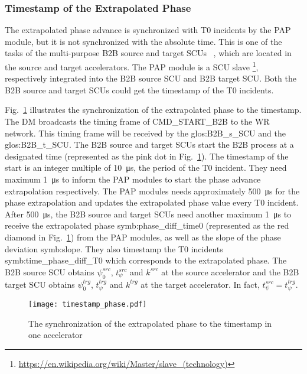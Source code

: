 \subsubsection{Timestamp of the Extrapolated Phase}
The extrapolated phase advance is synchronized with T0 incidents by the PAP module, but it is not synchronized with the absolute time. This is one of the tasks of the multi-purpose B2B source and target SCUs ~\cite{beck_new_2012, thieme_scu_2013}, which are located in the source and target accelerators. The PAP module is a SCU slave \footnote{\url{https://en.wikipedia.org/wiki/Master/slave_(technology)}}, respectively integrated into the B2B source SCU and B2B target SCU. Both the B2B source and target SCUs could get the timestamp of the T0 incidents. 

Fig.~\ref{phase_diff_syn_time} illustrates the synchronization of the extrapolated phase to the timestamp. The DM broadcasts the timing frame of CMD\_START\_B2B to the WR network. This timing frame will be received by the \gls{glos:B2B_s_SCU} and the \gls{glos:B2B_t_SCU}. The B2B source and target SCUs start the B2B process at a designated time (represented as the pink dot in Fig.~\ref{phase_diff_syn_time}). The timestamp of the start is an integer multiple of \SI{10}{\us}, the period of the T0 incident. They need maximum \SI{1}{\us} to inform the PAP modules to start the phase advance extrapolation respectively. The PAP modules needs approximately \SI{500}{\us} for the phase extrapolation and updates the extrapolated phase value every T0 incident. After \SI{500}{\us}, the B2B source and target SCUs need another maximum \SI{1}{\us} to receive the extrapolated phase \gls{symb:phase_diff_time0} (represented as the red diamond in Fig.~\ref{phase_diff_syn_time}) from the PAP modules, as well as the slope of the phase deviation \gls{symb:slope}. They also timestamp the T0 incidents \gls{symb:time_phase_diff_T0} which corresponds to the extrapolated phase. The B2B source SCU obtains $\psi^\mathit{src}_0$, $t_\psi^\mathit{src}$ and $k^\mathit{src}$ at the source accelerator and the B2B target SCU obtains $\psi^\mathit{trg}_0$, $t_\psi^\mathit{trg}$ and $k^\mathit{trg}$ at the target accelerator. In fact, $t_\psi^\mathit{src}=t_\psi^\mathit{trg}$.
 \begin{figure}[!htb]
   \centering   
   \texttt{[image: timestamp\_phase.pdf]}
   \caption{The synchronization of the extrapolated phase to the timestamp in one accelerator}
   \label{phase_diff_syn_time}
\end{figure}

